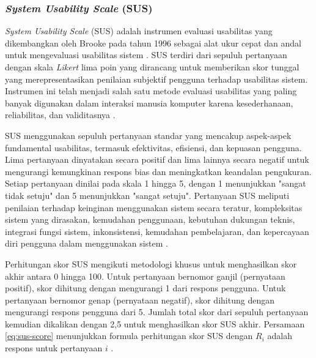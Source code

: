 
\subsubsection{\emph{System Usability Scale} (SUS)}
\label{subsubsec:sus}

\emph{System Usability Scale} (SUS) adalah instrumen evaluasi usabilitas yang dikembangkan oleh Brooke pada tahun 1996 sebagai alat ukur cepat dan andal untuk mengevaluasi usabilitas sistem \parencite{brooke1996sus}. SUS terdiri dari sepuluh pertanyaan dengan skala \emph{Likert} lima poin yang dirancang untuk memberikan skor tunggal yang merepresentasikan penilaian subjektif pengguna terhadap usabilitas sistem. Instrumen ini telah menjadi salah satu metode evaluasi usabilitas yang paling banyak digunakan dalam interaksi manusia komputer karena kesederhanaan, reliabilitas, dan validitasnya \parencite{bangor2008empirical}.

SUS menggunakan sepuluh pertanyaan standar yang mencakup aspek-aspek fundamental usabilitas, termasuk efektivitas, efisiensi, dan kepuasan pengguna. Lima pertanyaan dinyatakan secara positif dan lima lainnya secara negatif untuk mengurangi kemungkinan respons bias dan meningkatkan keandalan pengukuran. Setiap pertanyaan dinilai pada skala 1 hingga 5, dengan 1 menunjukkan "sangat tidak setuju" dan 5 menunjukkan "sangat setuju". Pertanyaan SUS meliputi penilaian terhadap keinginan menggunakan sistem secara teratur, kompleksitas sistem yang dirasakan, kemudahan penggunaan, kebutuhan dukungan teknis, integrasi fungsi sistem, inkonsistensi, kemudahan pembelajaran, dan kepercayaan diri pengguna dalam menggunakan sistem \parencite{brooke1996sus}.

Perhitungan skor SUS mengikuti metodologi khusus untuk menghasilkan skor akhir antara 0 hingga 100. Untuk pertanyaan bernomor ganjil (pernyataan positif), skor dihitung dengan mengurangi 1 dari respons pengguna. Untuk pertanyaan bernomor genap (pernyataan negatif), skor dihitung dengan mengurangi respons pengguna dari 5. Jumlah total skor dari sepuluh pertanyaan kemudian dikalikan dengan 2,5 untuk menghasilkan skor SUS akhir. Persamaan \eqref{eq:sus-score} menunjukkan formula perhitungan skor SUS dengan $R_i$ adalah respons untuk pertanyaan $i$ \parencite{tullis2013measuring}.

